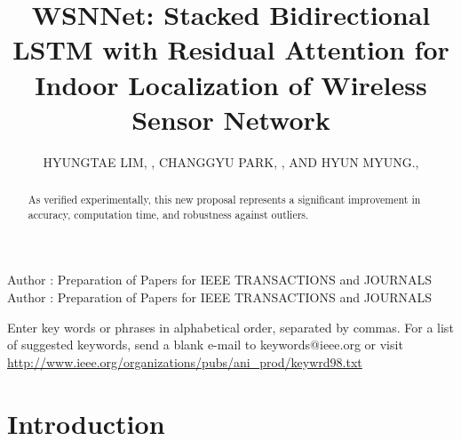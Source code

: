 \documentclass{ieeeaccess}
\begin{document}

\title{WSNNet: Stacked Bidirectional LSTM with Residual Attention for Indoor Localization of Wireless Sensor Network}
\author{\uppercase{HYUNGTAE LIM}, ,
	\uppercase{CHANGGYU PARK}, ,
	\uppercase{ and Hyun Myung}.,
	}
\address[1]{Urban Robotics Laboratory, Korea Advanced Institute of Science and Technology, Daejeon 34141, South Korea.}


\markboth
{Author \headeretal: Preparation of Papers for IEEE TRANSACTIONS and JOURNALS}
{Author \headeretal: Preparation of Papers for IEEE TRANSACTIONS and JOURNALS}


\begin{abstract}
	

As verified experimentally, this new proposal represents a significant improvement in accuracy, computation time, and robustness against outliers.

\end{abstract}

\begin{keywords}
Enter key words or phrases in alphabetical 
order, separated by commas. For a list of suggested keywords, send a blank 
e-mail to keywords@ieee.org or visit \underline
{http://www.ieee.org/organizations/pubs/ani\_prod/keywrd98.txt}
\end{keywords}

\titlepgskip=-15pt

\maketitle

\section{Introduction}
\label{sec:introduction}
\end{document}

